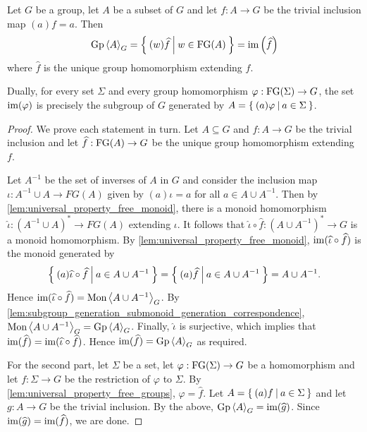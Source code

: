 \begin{lemma}%
  \label{lem:subgroup_characterization_free_group_image}
  \rocqok{}
  Let $G$ be a group, let $A$ be a subset of $G$ and let $f: A\rightarrow G$ be the trivial
  inclusion map $(a)f = a$. Then
  \[\textrm{Gp}\left\langle A \right\rangle_G = \left\{\: (w)\widehat{f} \: \middle|\: w\in \textrm{FG}(A) \:\right\} = \textrm{im}\left(\widehat{f}\right)\]
  where $\widehat{f}$ is the unique group homomorphism extending $f$.

  Dually, for every set $\Sigma$ and every group homomorphism $\varphi: \textrm{FG}(\Sigma)\rightarrow
  G$, the set $\textrm{im}(\varphi)$ is precisely the subgroup of $G$ generated by $A = \left\{\: (a)\varphi \: \middle|\: a\in \Sigma \:\right\}$.
\end{lemma}
\begin{proof}
  \rocqok{}
  We prove each statement in turn. Let $A\subseteq G$ and $f: A\rightarrow G$ be the trivial
  inclusion and let $\widehat{f}: \textrm{FG}(A) \rightarrow G$ be the unique group homomorphism extending $f$.

  Let $A^{-1}$ be the set of inverses of $A$ in $G$ and consider the
  inclusion map $\iota: A^{-1} \cup A \rightarrow FG(A)$ given by $(a)\iota = a$ for all $a\in
  A\cup A^{-1}$. Then by \cref{lem:universal_property_free_monoid}, there is a monoid homomorphism
  $\widehat{\iota}: {(A^{-1}\cup A)}^\ast \rightarrow FG(A)$ extending $\iota$.
  It follows that $\widehat{\iota}\circ \widehat{f}: {(A\cup A^{-1})}^\ast \rightarrow G$ is a
  monoid homomorphism. By \cref{lem:universal_property_free_monoid},
  $\textrm{im}(\widehat{\iota}\circ \widehat{f})$ is the monoid generated by
  \[\left\{\: (a)\widehat{\iota}\circ \widehat{f} \: \middle|\: a \in A \cup A^{-1} \:\right\}
    = \left\{\: (a)\widehat{f} \: \middle|\: a \in A\cup A^{-1} \:\right\} = A\cup A^{-1}.
  \]
  Hence $\textrm{im}(\widehat{\iota}\circ \widehat{f}) = \textrm{Mon}\left\langle A \cup A^{-1} \right\rangle_G$.
  By \cref{lem:subgroup_generation_submonoid_generation_correspondence},
  $\textrm{Mon}\left\langle A \cup A^{-1} \right\rangle_G = \textrm{Gp}\left\langle A \right\rangle_G$. Finally, $\widehat{\iota}$ is surjective,
  which implies that $\textrm{im}(\widehat{f}) = \textrm{im}(\widehat{\iota}\circ \widehat{f})$. Hence
  $\textrm{im}(\widehat{f}) = \textrm{Gp}\left\langle A \right\rangle_G$ as required.

  For the second part, let $\Sigma$ be a set, let $\varphi: \textrm{FG}(\Sigma) \rightarrow G$ be a
  homomorphism and let $f: \Sigma\rightarrow G$ be the restriction of $\varphi$ to $\Sigma$. By
  \cref{lem:universal_property_free_groups}, $\varphi = \widehat{f}$.
  Let $A = \left\{\: (a)f \: \middle|\: a \in \Sigma \:\right\}$ and let $g: A\rightarrow G$ be the trivial inclusion.
  By the above, $\textrm{Gp}\left\langle A \right\rangle_G = \textrm{im}(\widehat{g})$. Since $\textrm{im}(\widehat{g}) = \textrm{im}(\widehat{f})$, we are done.
\end{proof}

